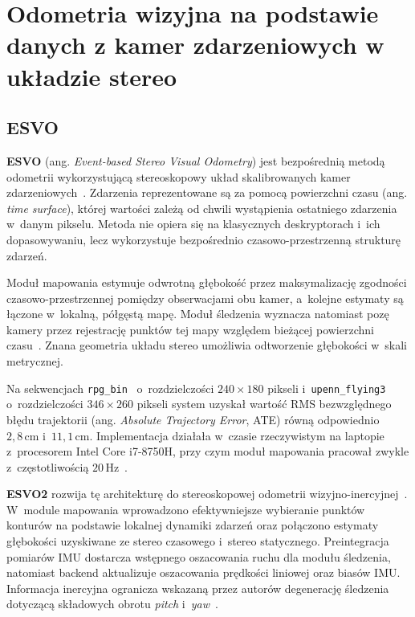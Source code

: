 \section{Odometria wizyjna na podstawie danych z kamer zdarzeniowych w układzie stereo}
\label{sec:literatura_event_vo}


\subsection{ESVO}
\label{subsec:literatura_esvo}

\textbf{ESVO} (ang. \textit{Event-based Stereo Visual Odometry}) jest bezpośrednią metodą odometrii wykorzystującą stereoskopowy układ skalibrowanych kamer zdarzeniowych~\cite{zhou2021esvo}. Zdarzenia reprezentowane są za pomocą powierzchni czasu (ang. \textit{time surface}), której wartości zależą od chwili wystąpienia ostatniego zdarzenia w~danym pikselu. Metoda nie opiera się na klasycznych deskryptorach i~ich dopasowywaniu, lecz wykorzystuje bezpośrednio czasowo-przestrzenną strukturę zdarzeń.

Moduł mapowania estymuje odwrotną głębokość przez maksymalizację zgodności czasowo-przestrzennej pomiędzy obserwacjami obu kamer, a~kolejne estymaty są łączone w~lokalną, półgęstą mapę. Moduł śledzenia wyznacza natomiast pozę kamery przez rejestrację punktów tej mapy względem bieżącej powierzchni czasu~\cite{zhou2021esvo}. Znana geometria układu stereo umożliwia odtworzenie głębokości w~skali metrycznej.

Na sekwencjach \texttt{rpg\_bin}~\cite{zhou2018stereoreconstruction} o~rozdzielczości $240\times180$ pikseli i~\texttt{upenn\_flying3}~\cite{zhu2018mvsec} o~rozdzielczości $346\times260$ pikseli system uzyskał wartość RMS bezwzględnego błędu trajektorii (ang. \textit{Absolute Trajectory Error}, ATE) równą odpowiednio $2{,}8\,\mathrm{cm}$ i~$11{,}1\,\mathrm{cm}$. Implementacja działała w~czasie rzeczywistym na laptopie z~procesorem Intel Core i7-8750H, przy czym moduł mapowania pracował zwykle z~częstotliwością $20\,\mathrm{Hz}$~\cite{zhou2021esvo}.

\textbf{ESVO2} rozwija tę architekturę do stereoskopowej odometrii wizyjno-inercyjnej~\cite{niu2025esvo2}. W~module mapowania wprowadzono efektywniejsze wybieranie punktów konturów na podstawie lokalnej dynamiki zdarzeń oraz połączono estymaty głębokości uzyskiwane ze stereo czasowego i~stereo statycznego. Preintegracja pomiarów IMU dostarcza wstępnego oszacowania ruchu dla modułu śledzenia, natomiast backend aktualizuje oszacowania prędkości liniowej oraz biasów IMU. Informacja inercyjna ogranicza wskazaną przez autorów degenerację śledzenia dotyczącą składowych obrotu \textit{pitch} i~\textit{yaw}~\cite{niu2025esvo2}.

